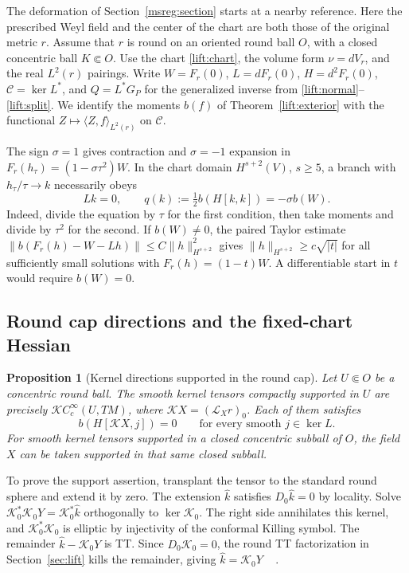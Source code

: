 \documentclass[11pt]{article}
\numberwithin{equation}{section}
\newtheorem{proposition}[theorem]{Proposition}
\theoremstyle{definition}
\theoremstyle{remark}
\begin{document}
The deformation of Section~\ref{msreg:section} starts at a nearby
reference. Here the prescribed Weyl field and the center of the chart
are both those of the original metric \(r\).
Assume that \(r\) is round on an oriented round ball \(O\), with a
closed concentric ball \(K\Subset O\). Use the chart
\eqref{lift:chart}, the volume form \(\nu=dV_r\), and the real
\(L^2(r)\) pairings. Write \(W=F_r(0)\), \(L=dF_r(0)\),
\(H=d^2F_r(0)\), \(\mathcal C=\ker L^*\), and \(Q=L^*G_P\) for the
generalized inverse from \eqref{lift:normal}--\eqref{lift:split}.
We identify the moments \(b(f)\) of Theorem~\ref{lift:exterior}
with the functional \(Z\mapsto\langle Z,f\rangle_{L^2(r)}\)
on \(\mathcal C\).

The sign \(\sigma=1\) gives contraction and \(\sigma=-1\) expansion
in \(F_r(h_\tau)=(1-\sigma\tau^2)W\). In the chart domain
\(H^{s+2}(V)\), \(s\ge5\), a branch with \(h_\tau/\tau\to k\)
necessarily obeys
\begin{equation}\label{mscone:balance}
 Lk=0,\qquad q(k):=\tfrac12 b(H[k,k])=-\sigma b(W).
\end{equation}
Indeed, divide the equation by \(\tau\) for the first condition,
then take moments and divide by \(\tau^2\) for the second.
If \(b(W)\ne0\), the paired Taylor estimate
\(\|b(F_r(h)-W-Lh)\|\le C\|h\|_{H^{s+2}}^2\) gives
\(\|h\|_{H^{s+2}}\ge c\sqrt{|t|}\) for all sufficiently small
solutions with \(F_r(h)=(1-t)W\). A differentiable start in \(t\)
would require \(b(W)=0\).

\subsection{Round cap directions and the fixed-chart Hessian}

\begin{proposition}[Kernel directions supported in the round cap]
\label{mscone:cap}
Let \(U\Subset O\) be a concentric round ball. The smooth kernel
tensors compactly supported in \(U\) are precisely
\(\mathcal K C_c^\infty(U,TM)\), where
\(\mathcal K X=(\mathcal L_Xr)_0\). Each of them satisfies
\[
 b(H[\mathcal K X,j])=0
 \qquad\text{for every smooth }j\in\ker L.
\]
For smooth kernel tensors supported in a closed concentric
subball of \(O\), the field \(X\) can be taken supported in that
same closed subball.
\end{proposition}

To prove the support assertion, transplant the tensor to the
standard round sphere and extend it by zero. The extension
\(\widehat k\) satisfies \(D_0\widehat k=0\) by locality. Solve
\(\mathcal K_0^*\mathcal K_0 Y=\mathcal K_0^*\widehat k\)
orthogonally to \(\ker\mathcal K_0\). The right side annihilates
this kernel, and \(\mathcal K_0^*\mathcal K_0\) is elliptic by
injectivity of the conformal Killing symbol. The remainder
\(\widehat k-\mathcal K_0Y\) is TT. Since \(D_0\mathcal K_0=0\),
the round TT factorization in Section~\ref{sec:lift} kills the
remainder, giving \(\widehat k=\mathcal K_0Y\)
~\cite[\S3]{York1974Covariant}
\cite[Theorem 3.10 and \S7.1]{GurskyViaclovsky2015}.
\end{document}
